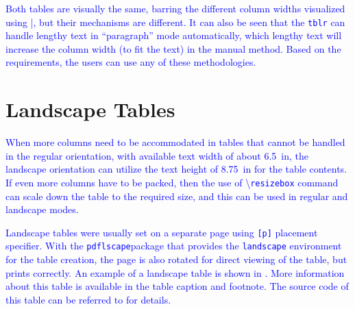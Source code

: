 \documentclass[phd,showframe]{ndsu-thesis-2022}
\newcommand\italk[1]{\textcolor{blue}{#1}}  %
\newcommand\cmd[1]{\textbackslash\texttt{#1}}  %
\newcommand\vb[1]{\textcolor{blue}{\texttt{#1}}}%
\begin{document}
\italk{Both tables are visually the same, barring the different column widths visualized using |, but their mechanisms are different. It can also be seen that the \vb{tblr} \Cref{tab30} can handle lengthy text in ``paragraph'' mode automatically, which lengthy text will increase the column width (to fit the text) in the manual method. Based on the requirements, the users can use any of these methodologies. }

 
\section{Landscape Tables}

\italk{When more columns need to be accommodated in tables that cannot be handled in the regular orientation, with available text width of about \qty{6.5}{in}, the landscape orientation can utilize the text height of \qty{8.75}{in} for the table contents. If even more columns have to be packed, then the use of \cmd{resizebox} command can scale down the table to the required size, and this can be used in regular and landscape modes.}

\italk{Landscape tables were usually set on a separate page using \vb{[p]} placement specifier. With the \vb{pdflscape}\cptp package that provides the \vb{landscape} environment for the table creation, the page is also rotated for direct viewing of the table, but prints correctly. An example of a landscape table is shown in \Cref{tab212}. More information about this table is available in the table caption and footnote. The source code of this table can be referred to for details.
}

\kant[4]
\end{document}
